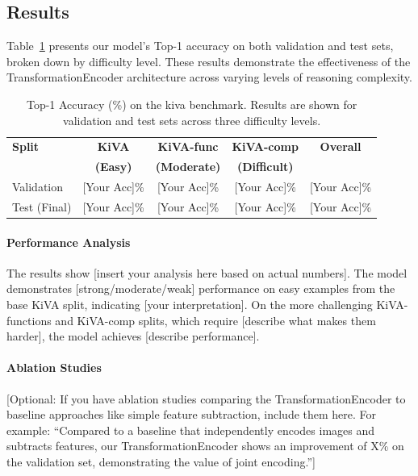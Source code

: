 \documentclass[twocolumn]{article} %
\begin{document}
\subsection{Results}

Table~\ref{tab:kiva_results} presents our model's Top-1 accuracy on both validation and test sets, broken down by difficulty level. These results demonstrate the effectiveness of the TransformationEncoder architecture across varying levels of reasoning complexity.

\begin{table}[!htb]
    \caption{Top-1 Accuracy (\%) on the \gls{kiva} benchmark. Results are shown for validation and test sets across three difficulty levels.}
    \label{tab:kiva_results}
    \centering
    \begin{tabular}{lcccc}
        \toprule
        \textbf{Split} & \textbf{KiVA} & \textbf{KiVA-func} & \textbf{KiVA-comp} & \textbf{Overall} \\
         & \textbf{(Easy)} & \textbf{(Moderate)} & \textbf{(Difficult)} & \\
        \midrule
        Validation & [Your Acc]\% & [Your Acc]\% & [Your Acc]\% & [Your Acc]\% \\
        Test (Final) & [Your Acc]\% & [Your Acc]\% & [Your Acc]\% & [Your Acc]\% \\
        \bottomrule
    \end{tabular}
\end{table}

\paragraph{Performance Analysis}
The results show [insert your analysis here based on actual numbers]. The model demonstrates [strong/moderate/weak] performance on easy examples from the base KiVA split, indicating [your interpretation]. On the more challenging KiVA-functions and KiVA-comp splits, which require [describe what makes them harder], the model achieves [describe performance].

\paragraph{Ablation Studies}
[Optional: If you have ablation studies comparing the TransformationEncoder to baseline approaches like simple feature subtraction, include them here. For example: ``Compared to a baseline that independently encodes images and subtracts features, our TransformationEncoder shows an improvement of X\% on the validation set, demonstrating the value of joint encoding.'']
\end{document}
